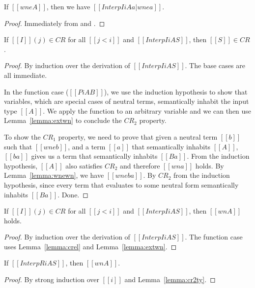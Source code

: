 \documentclass[acmsmall]{acmart}
\begin{document}
\begin{lemma}
  \label{lemma:cr1ty}
  If $[[wne A]]$, then we have $[[Interp I i A {a | wne a }]]$.
\end{lemma}
\begin{proof}
  Immediately from  and .
\end{proof}

\begin{lemma}
  \label{lemma:crel}
  If $[[I]](j) \in CR$ for all $[[j < i]]$ and $[[Interp I i A S]]$, then $[[S]] \in CR$.
\end{lemma}
\begin{proof}
  By induction over the derivation of $[[Interp I i A S]]$. The base
  cases are all immediate.

  In the function case ($[[Pi A B]]$), we use the induction
  hypothesis to show that variables, which are special cases of
  neutral terms, semantically inhabit the input type $[[A]]$. We apply the
  function to an arbitrary variable and we can then use
  Lemma~\ref{lemma:extwn} to conclude the $CR_2$ property.

  To show
  the $CR_1$ property, we need to prove that given a neutral term $[[b]]$
  such that $[[wne b]]$,
  and a term $[[a]]$ that semantically inhabits $[[A]]$, $[[b a]]$ gives
  us a term that semantically inhabits $[[B {a}]]$. From the induction
  hypothesis, $[[A]]$ also satisfies $CR_2$ and therefore $[[wn a]]$
  holds. By Lemma~\ref{lemma:wnewn}, we have $[[wne b a]]$. By $CR_2$
  from the induction hypothesis, since every term that evaluates to
  some neutral form semantically inhabits $[[B {a}]]$. Done.
\end{proof}


\begin{lemma}
  \label{lemma:cr2ty}
  If $[[I]](j) \in CR$ for all $[[j < i]]$ and $[[Interp I i A S]]$, then $[[wn A]]$ holds.
\end{lemma}
\begin{proof}
  By induction over the derivation of $[[Interp I i A S]]$. The
  function case uses Lemma~\ref{lemma:crel} and Lemma~\ref{lemma:extwn}.
\end{proof}

\begin{lemma}
  \label{lemma:cr2tyrec}
  If $[[InterpR i A S]]$, then $[[wn A]]$.
\end{lemma}
\begin{proof}
  By strong induction over $[[i]]$ and Lemma~\ref{lemma:cr2ty}.
\end{proof}
\end{document}
